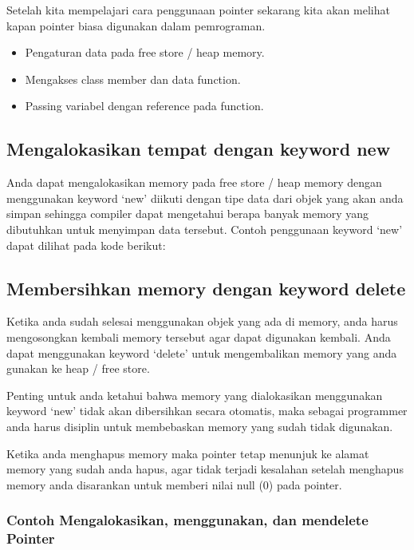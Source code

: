 Setelah kita mempelajari cara penggunaan pointer sekarang kita akan
melihat kapan pointer biasa digunakan dalam pemrograman.

\begin{itemize}

\item
 Pengaturan data pada free store / heap memory.
\item
 Mengakses class member dan data function.
\item
 Passing variabel dengan reference pada function.
\end{itemize}

\subsection{Mengalokasikan tempat dengan keyword new}\label{mengalokasikan-tempat-dengan-keyword-new}

Anda dapat mengalokasikan memory pada free store / heap memory dengan
menggunakan keyword `new' diikuti dengan tipe data dari objek yang akan
anda simpan sehingga compiler dapat mengetahui berapa banyak memory yang
dibutuhkan untuk menyimpan data tersebut. Contoh penggunaan keyword
`new' dapat dilihat pada kode berikut:



\subsection{Membersihkan memory dengan keyword delete}\label{membersihkan-memory-dengan-keyword-delete}

Ketika anda sudah selesai menggunakan objek yang ada di memory, anda
harus mengosongkan kembali memory tersebut agar dapat digunakan kembali.
Anda dapat menggunakan keyword `delete' untuk mengembalikan memory yang
anda gunakan ke heap / free store.

Penting untuk anda ketahui bahwa memory yang dialokasikan menggunakan
keyword `new' tidak akan dibersihkan secara otomatis, maka sebagai
programmer anda harus disiplin untuk membebaskan memory yang sudah tidak
digunakan.

Ketika anda menghapus memory maka pointer tetap menunjuk ke alamat
memory yang sudah anda hapus, agar tidak terjadi kesalahan setelah
menghapus memory anda disarankan untuk memberi nilai null (0) pada
pointer.

\subsubsection*{Contoh Mengalokasikan, menggunakan, dan mendelete Pointer}

